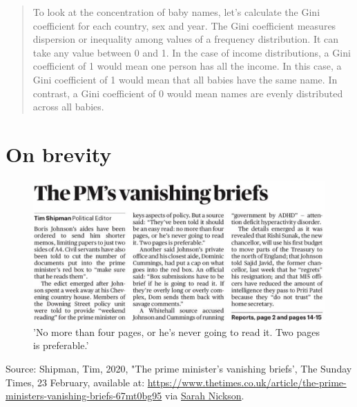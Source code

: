 \documentclass[
]{book}
\begin{document}
\begin{quote}
To look at the concentration of baby names, let's calculate the Gini coefficient for each country, sex and year. The Gini coefficient measures dispersion or inequality among values of a frequency distribution. It can take any value between 0 and 1. In the case of income distributions, a Gini coefficient of 1 would mean one person has all the income. In this case, a Gini coefficient of 1 would mean that all babies have the same name. In contrast, a Gini coefficient of 0 would mean names are evenly distributed across all babies.
\end{quote}

\hypertarget{on-brevity}{%
\section{On brevity}\label{on-brevity}}

\begin{figure}
\includegraphics[width=0.9\linewidth]{figures/johnson} \caption{'No more than four pages, or he's never going to read it. Two pages is preferable.'}\label{fig:unnamed-chunk-99}
\end{figure}

Source: Shipman, Tim, 2020, "The prime minister's vanishing briefs', The Sunday Times, 23 February, available at: \url{https://www.thetimes.co.uk/article/the-prime-ministers-vanishing-briefs-67mt0bg95} via \href{https://twitter.com/sarahjnickson}{Sarah Nickson}.
\end{document}
